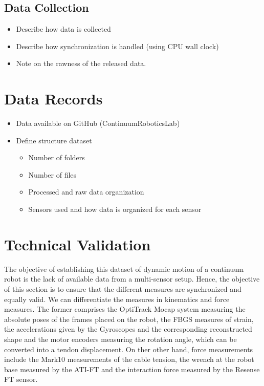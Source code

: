 \documentclass[14pt, a4paper]{article}
\begin{document}
\subsection{Data Collection}
\begin{itemize}
    \item Describe how data is collected
    \item Describe how synchronization is handled (using CPU wall clock)
    \item Note on the rawness of the released data.
\end{itemize}

\section{Data Records}
\begin{itemize}
    \item Data available on GitHub (ContinuumRoboticsLab)
    \item Define structure dataset
    \begin{itemize}
        \item Number of folders
        \item Number of files
        \item Processed and raw data organization
        \item Sensors used and how data is organized for each sensor
    \end{itemize}
\end{itemize}

\section{Technical Validation}
The objective of establishing this dataset of dynamic motion of a continuum robot is the lack of available data from a multi-sensor setup.
Hence, the objective of this section is to ensure that the different measures are synchronized and equally valid. 
We can differentiate the measures in kinematics and force measures. 
The former comprises the OptiTrack Mocap system measuring the absolute poses of the frames placed on the robot, the FBGS measures of strain, the accelerations given by the Gyroscopes and the corresponding reconstructed shape and the motor encoders measuring the rotation angle, which can be converted into a tendon displacement.
On ther other hand, force measurements include the Mark10 measurements of the cable tension, the wrench at the robot base measured by the ATI-FT and the interaction force measured by the Resense FT sensor.
\end{document}
